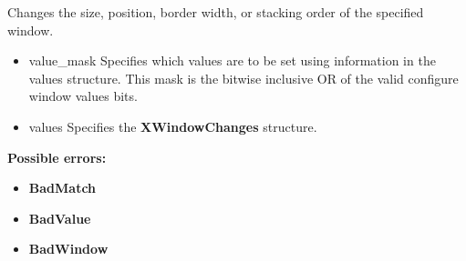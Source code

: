 \documentclass{report}
\begin{document}
\begin{itemize}
            \bigbreak \noindent
            Changes the size, position, border width, or stacking order of the specified window.
            \begin{itemize}
                \item value\_mask Specifies which values are to be set using information in the values structure. This mask is the bitwise inclusive OR of the valid configure window values bits.
                \item values Specifies the \textbf{XWindowChanges} structure.
            \end{itemize}
            \bigbreak \noindent
            \textbf{Possible errors:}
            \begin{itemize}
                \item \textbf{BadMatch}
                \item \textbf{BadValue}
                \item \textbf{BadWindow}
            \end{itemize}
       

    \end{itemize}

    \pagebreak 
\end{document}
